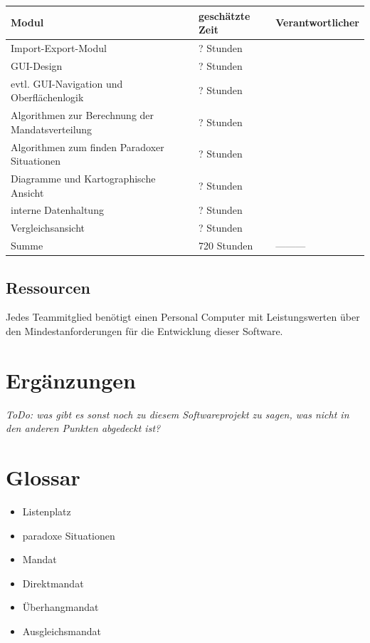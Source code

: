 \documentclass[10pt,a4paper]{article}
\begin{document}
\begin{tabular}[h]{lll}
	\hline
	\textbf{Modul} & \textbf{geschätzte Zeit} & \textbf{Verantwortlicher} \\
	\hline
	Import-Export-Modul & ? Stunden &  \\
	GUI-Design & ? Stunden &  \\
	evtl. GUI-Navigation und Oberflächenlogik & ? Stunden &  \\
	Algorithmen zur Berechnung der Mandatsverteilung & ? Stunden &  \\
	Algorithmen zum finden Paradoxer Situationen  & ? Stunden &  \\
	Diagramme und Kartographische Ansicht  & ? Stunden &  \\
	interne Datenhaltung  & ? Stunden &  \\
	Vergleichsansicht & ? Stunden &  \\
	\hline
	Summe & 720 Stunden & --------- \\
	\hline
\end{tabular}

\subsection{Ressourcen}
Jedes Teammitglied benötigt einen Personal Computer mit Leistungswerten über den Mindestanforderungen für die Entwicklung dieser Software.


\section{Ergänzungen}
\textit{ToDo: was gibt es sonst noch zu diesem Softwareprojekt zu sagen, was nicht in den anderen Punkten abgedeckt ist?}

\section{Glossar}
\begin{itemize}
	\item Listenplatz
	\item paradoxe Situationen
	\item Mandat	
	\item Direktmandat	
	\item Überhangmandat
	\item Ausgleichsmandat
\end{itemize}
\end{document}
